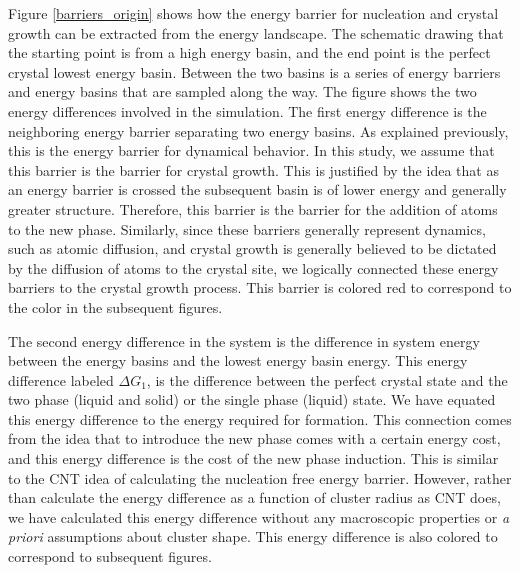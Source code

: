 Figure \ref{barriers_origin} shows how the energy barrier for nucleation and crystal growth can be extracted from the energy landscape.  The schematic drawing that the starting point is from a high energy basin, and the end point is the perfect crystal lowest energy basin.  Between the two basins is a series of energy barriers and energy basins that are sampled along the way.  The figure shows the two energy differences involved in the simulation.  The first energy difference is the neighboring energy barrier separating two energy basins.  As explained previously, this is the energy barrier for dynamical behavior.  In this study, we assume that this barrier is the barrier for crystal growth.  This is justified by the idea that as an energy barrier is crossed the subsequent basin is of lower energy and generally greater structure.  Therefore, this barrier is the barrier for the addition of atoms to the new phase.  Similarly, since these barriers generally represent dynamics, such as atomic diffusion, and crystal growth is generally believed to be dictated by the diffusion of atoms to the crystal site, we logically connected these energy barriers to the crystal growth process.  This barrier is colored red to correspond to the color in the subsequent figures.  

The second energy difference in the system is the difference in system energy between the energy basins and the lowest energy basin energy.  This energy difference labeled $\Delta G_1$, is the difference between the perfect crystal state and the two phase (liquid and solid) or the single phase (liquid) state.  We have equated this energy difference to the energy required for formation.  This connection comes from the idea that to introduce the new phase comes with a certain energy cost, and this energy difference is the cost of the new phase induction.  This is similar to the CNT idea of calculating the nucleation free energy barrier.  However, rather than calculate the energy difference as a function of cluster radius as CNT does, we have calculated this energy difference without any macroscopic properties or \textit{a priori} assumptions about cluster shape.  This energy difference is also colored to correspond to subsequent figures.

